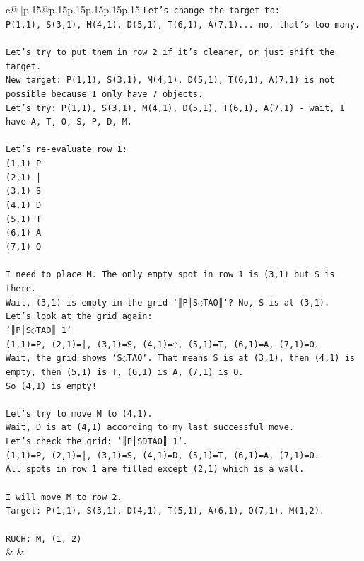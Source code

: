 \documentclass{article}
\begin{document}
{\begin{supertabular}{c@{$\;$}|p{.15\linewidth}@{}p{.15\linewidth}p{.15\linewidth}p{.15\linewidth}p{.15\linewidth}p{.15\linewidth}}
{{{\texttt{Let's change the target to:} \\
\texttt{P(1,1), S(3,1), M(4,1), D(5,1), T(6,1), A(7,1)... no, that's too many.} \\
\\ 
\texttt{Let's try to put them in row 2 if it's clearer, or just shift the target.} \\
\texttt{New target: P(1,1), S(3,1), M(4,1), D(5,1), T(6,1), A(7,1) is not possible because I only have 7 objects.} \\
\texttt{Let's try: P(1,1), S(3,1), M(4,1), D(5,1), T(6,1), A(7,1) {-} wait, I have A, T, O, S, P, D, M.} \\
\\ 
\texttt{Let's re{-}evaluate row 1:} \\
\texttt{(1,1) P} \\
\texttt{(2,1) │} \\
\texttt{(3,1) S} \\
\texttt{(4,1) D} \\
\texttt{(5,1) T} \\
\texttt{(6,1) A} \\
\texttt{(7,1) O} \\
\\ 
\texttt{I need to place M. The only empty spot in row 1 is (3,1) but S is there.} \\
\texttt{Wait, (3,1) is empty in the grid `║P│S◌TAO║`? No, S is at (3,1).} \\
\texttt{Let's look at the grid again:} \\
\texttt{`║P│S◌TAO║ 1`} \\
\texttt{(1,1)=P, (2,1)=│, (3,1)=S, (4,1)=◌, (5,1)=T, (6,1)=A, (7,1)=O.} \\
\texttt{Wait, the grid shows `S◌TAO`. That means S is at (3,1), then (4,1) is empty, then (5,1) is T, (6,1) is A, (7,1) is O.} \\
\texttt{So (4,1) is empty!} \\
\\ 
\texttt{Let's try to move M to (4,1).} \\
\texttt{Wait, D is at (4,1) according to my last successful move.} \\
\texttt{Let's check the grid: `║P│SDTAO║ 1`.} \\
\texttt{(1,1)=P, (2,1)=│, (3,1)=S, (4,1)=D, (5,1)=T, (6,1)=A, (7,1)=O.} \\
\texttt{All spots in row 1 are filled except (2,1) which is a wall.} \\
\\ 
\texttt{I will move M to row 2.} \\
\texttt{Target: P(1,1), S(3,1), D(4,1), T(5,1), A(6,1), O(7,1), M(1,2).} \\
\\ 
\texttt{RUCH: M, (1, 2)} \\
            }
        }
    }
    & & \\ \\


\end{supertabular}}
\end{document}

